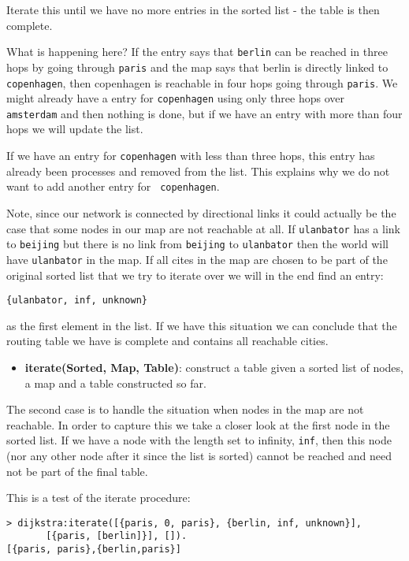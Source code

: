\documentclass[a4paper, 11pt]{article}
\begin{document}
Iterate this until we have no more entries in the sorted list - the
table is then complete.

What is happening here? If the entry says that {\tt berlin} can be
reached in three hops by going through {\tt paris} and the map says
that berlin is directly linked to {\tt copenhagen}, then copenhagen is
reachable in four hops going through {\tt paris}. We might already have
a entry for {\tt copenhagen} using only three hops over {\tt
amsterdam} and then nothing is done, but if we have an entry with more
than four hops we will update the list.

If we have an entry for {\tt copenhagen} with less than three
hops, this entry has already been processes and removed from the
list. This explains why we do not want to add another entry for {\tt
copenhagen}.

Note, since our network is connected by directional links it could
actually be the case that some nodes in our map are not reachable at
all. If {\tt ulanbator} has a link to {\tt beijing} but there is no
link from {\tt beijing} to {\tt ulanbator} then the world will have
{\tt ulanbator} in the map. If all cites in the map are chosen to be
part of the original sorted list that we try to iterate over we will
in the end find an entry:

\begin{verbatim}
{ulanbator, inf, unknown}
\end{verbatim}

as the first element in the list. If we have this situation we can
conclude that the routing table we have is complete and contains all
reachable cities. 

\begin{itemize}
\item {\bf iterate(Sorted, Map, Table)}: construct a table given a sorted
list of nodes, a map and a table constructed so far.
\end{itemize}

The second case is to handle the situation when nodes in the map are 
not reachable. In order to capture this we take a closer look at
the first node in the sorted list. If we have a node with the length
set to infinity, {\tt inf}, then this node (nor any other node after
it since the list is sorted) cannot be reached and need not be part of
the final table.

This is a test of the iterate procedure:

\begin{verbatim}
> dijkstra:iterate([{paris, 0, paris}, {berlin, inf, unknown}], 
       [{paris, [berlin]}], []).
[{paris, paris},{berlin,paris}]
\end{verbatim}
\end{document}
